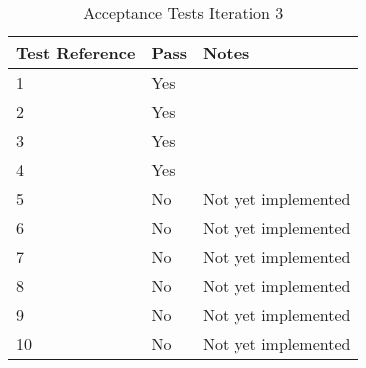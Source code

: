 \begin{table}[h]
\centering
\small
\begin{tabular}{lll}
\hline
\textbf{Test Reference} & \textbf{Pass} & \textbf{Notes} \\ \hline
1              & Yes              &                \\ 
2              & Yes              &                \\ 
3              & Yes              &                \\ 
4              & Yes              &                \\ 
5              & No              & Not yet implemented               \\ 
6              & No              & Not yet implemented               \\ 
7              & No              & Not yet implemented               \\ 
8              & No              & Not yet implemented               \\ 
9              & No              & Not yet implemented               \\ 
10             & No              & Not yet implemented               \\ \hline
\end{tabular}
\caption{Acceptance Tests Iteration 3 \protect {\label{tab:acc_test_2}}}
\end{table}
